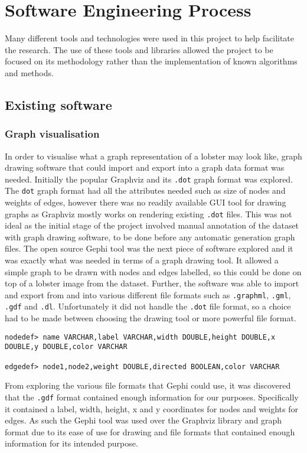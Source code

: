 \section{Software Engineering Process}
Many different tools and technologies were used in this project to help facilitate the research. The use of these tools and libraries allowed the project to be focused on its methodology rather than the implementation of known algorithms and methods. 
\subsection{Existing software}

\subsubsection{Graph visualisation}
In order to visualise what a graph representation of a lobster may look like, graph drawing software that could import and export into a graph data format was needed. Initially the popular Graphviz and its \texttt{.dot} graph format \cite{graphviz-dot} was explored. The \texttt{dot} graph format had all the attributes needed such as size of nodes and weights of edges, however there was no readily available GUI tool for drawing graphs as Graphviz mostly works on rendering existing \texttt{.dot} files. This was not ideal as the initial stage of the project involved manual annotation of the dataset with graph drawing software, to be done before any automatic generation graph files. 
\n
The open source Gephi \cite{gephi} tool was the next piece of software explored and it was exactly what was needed in terms of a graph drawing tool. It allowed a simple graph to be drawn with nodes and edges labelled, so this could be done on top of a lobster image from the dataset. Further, the software was able to import and export from and into various different file formats such as \texttt{.graphml}, \texttt{.gml}, \texttt{.gdf} and \texttt{.dl}. Unfortunately it did not handle the \texttt{.dot} file format, so a choice had to be made between choosing the drawing tool or more powerful file format. 
\begin{lstlisting}[caption={Header formats for \texttt{.gdf} files showing the kind of node and edge data it could keep.}]
nodedef> name VARCHAR,label VARCHAR,width DOUBLE,height DOUBLE,x DOUBLE,y DOUBLE,color VARCHAR

edgedef> node1,node2,weight DOUBLE,directed BOOLEAN,color VARCHAR
\end{lstlisting}
From exploring the various file formats that Gephi could use, it was discovered that the \texttt{.gdf} format contained enough information for our purposes. Specifically it contained a label, width, height, x and y coordinates for nodes and weights for edges. As such the Gephi tool was used over the Graphviz library and graph format due to its ease of use for drawing and file formats that contained enough information for its intended purpose.

